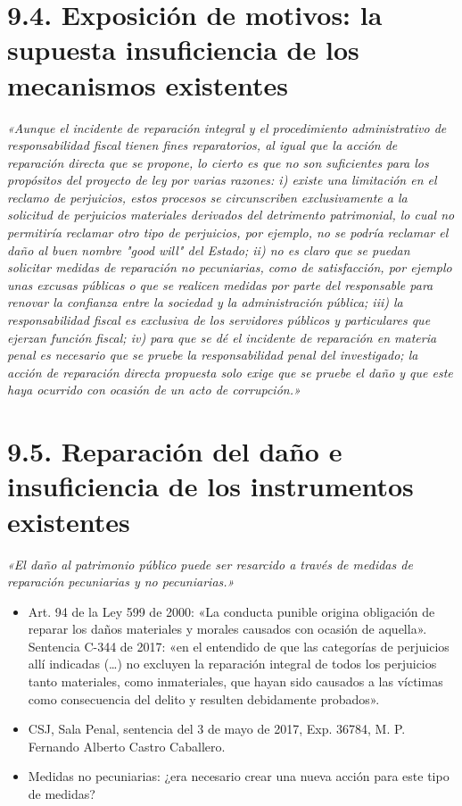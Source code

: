 \section{9.4. Exposición de motivos: la supuesta insuficiencia de los mecanismos existentes}
\begin{cita}
\textit{«Aunque el incidente de reparación integral y el procedimiento administrativo de responsabilidad fiscal tienen fines reparatorios, al igual que la acción de reparación directa que se propone, lo cierto es que no son suficientes para los propósitos del proyecto de ley por varias razones: i) existe una limitación en el reclamo de perjuicios, estos procesos se circunscriben exclusivamente a la solicitud de perjuicios materiales derivados del detrimento patrimonial, lo cual no permitiría reclamar otro tipo de perjuicios, por ejemplo, no se podría reclamar el daño al buen nombre "good will" del Estado; ii) no es claro que se puedan solicitar medidas de reparación no pecuniarias, como de satisfacción, por ejemplo unas excusas públicas o que se realicen medidas por parte del responsable para renovar la confianza entre la sociedad y la administración pública; iii) la responsabilidad fiscal es exclusiva de los servidores públicos y particulares que ejerzan función fiscal; iv) para que se dé el incidente de reparación en materia penal es necesario que se pruebe la responsabilidad penal del investigado; la acción de reparación directa propuesta solo exige que se pruebe el daño y que este haya ocurrido con ocasión de un acto de corrupción.»}
\end{cita}
\section{9.5. Reparación del daño e insuficiencia de los instrumentos existentes}
\begin{cita}
\textit{«El daño al patrimonio público puede ser resarcido a través de medidas de reparación pecuniarias y no pecuniarias.»}
\end{cita}
\begin{itemize}
\item Art. 94 de la Ley 599 de 2000: «La conducta punible origina obligación de reparar los daños materiales y morales causados con ocasión de aquella». Sentencia C-344 de 2017: «en el entendido de que las categorías de perjuicios allí indicadas (…) no excluyen la reparación integral de todos los perjuicios tanto materiales, como inmateriales, que hayan sido causados a las víctimas como consecuencia del delito y resulten debidamente probados».
\item CSJ, Sala Penal, sentencia del 3 de mayo de 2017, Exp. 36784, M. P. Fernando Alberto Castro Caballero.
\item Medidas no pecuniarias: ¿era necesario crear una nueva acción para este tipo de medidas?
\end{itemize}
